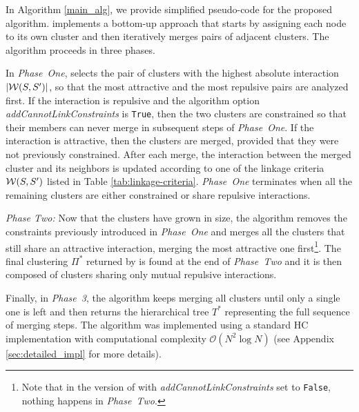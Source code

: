 In Algorithm \ref{main_alg}, we provide simplified pseudo-code for the proposed \algname{} algorithm. \algname{} implements a bottom-up approach that starts by assigning each node to its own cluster and then iteratively merges pairs of adjacent clusters. The algorithm proceeds in three phases. 

In \emph{Phase~One}, \algname{} selects the pair of clusters with the highest absolute interaction $|\mathcal{W}(S, S')|$, so that the most attractive and the most repulsive pairs are analyzed first. If the interaction is repulsive and the algorithm option \emph{addCannotLinkConstraints} is \texttt{True}, then the two clusters are constrained so that their members can never merge in subsequent steps of \emph{Phase~One}. If the interaction is attractive, then the clusters are merged, provided that they were not previously constrained. 
After each merge, the interaction between the merged cluster and its neighbors is updated according to one of the linkage criteria $\mathcal{W}(S, S')$ listed in Table \ref{tab:linkage-criteria}. \emph{Phase~One} terminates when all the remaining clusters are either constrained or share repulsive interactions.

\emph{Phase Two:} Now that the clusters have grown in size, the algorithm removes the constraints previously introduced in \emph{Phase~One} and merges all the clusters that still share an attractive interaction, merging the most attractive one first\footnote{Note that in the version of \algname{} with \emph{addCannotLinkConstraints} set to \texttt{False}, nothing happens in \emph{Phase~Two}.}. The final clustering $\Pi^*$ returned by \algname{} is found at the end of \emph{Phase~Two} and it is then composed of clusters sharing only mutual repulsive interactions. 

Finally, in \emph{Phase~3}, the algorithm keeps merging all clusters until only a single one is left and then returns the hierarchical tree $T^*$ representing the full sequence of merging steps.
The algorithm was implemented using a standard HC implementation with computational complexity $\mathcal{O}(N^2 \log N)$ (see Appendix \ref{sec:detailed_impl} for more details). 




